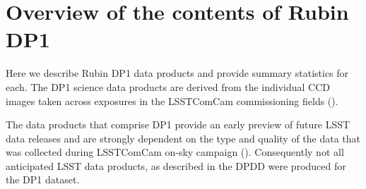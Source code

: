 \section{Overview of the contents of Rubin DP1
\label{sec:data_products}}

Here we describe Rubin \gls{DP1} data products and provide summary statistics for each.
The \gls{DP1} science data products are derived from the \nvisitimages individual \gls{CCD} images taken across \nexposures exposures in the \nfields \gls{LSSTComCam} commissioning fields ().

The data products that comprise \gls{DP1} provide an early preview of future LSST data releases and are strongly dependent on the type and quality of the data that was collected during \gls{LSSTComCam} on-sky campaign ().
Consequently not all anticipated  \gls{LSST} data products, as described in the \gls{DPDD} \citep{LSE-163} were produced for the \gls{DP1} dataset.

